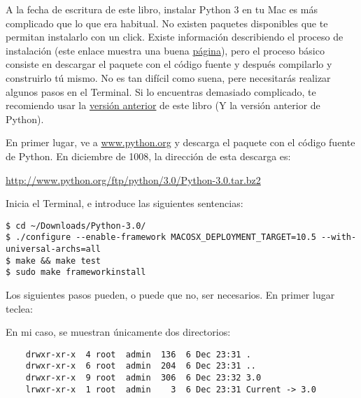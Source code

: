 \begin{MAC}

\noindent
A la fecha de escritura de este libro, instalar Python 3 en tu Mac es más complicado que lo que era habitual. No existen paquetes disponibles que te permitan instalarlo con un click. Existe información describiendo el proceso de instalación (este enlace muestra una buena \href{http://farmdev.com/thoughts/66/python-3-0-on-mac-os-x-alongside-2-6-2-5-etc-/}{página}), pero el proceso básico consiste en descargar el paquete con el código fuente y después compilarlo y construirlo tú mismo. No es tan difícil como suena, pere necesitarás realizar algunos pasos en el Terminal. Si lo encuentras demasiado complicado, te recomiendo usar la \href{http://www.briggs.net.nz/log/wp-content/uploads/2008/03/swfk-mac.zip}{versión anterior} de este libro (Y la versión anterior de Python).

\noindent
En primer lugar, ve a \href{www.python.org}{www.python.org} y descarga el paquete con el código fuente de Python. En diciembre de 1008, la dirección de esta descarga es:

\noindent
\href{http://www.python.org/ftp/python/3.0/Python-3.0.tar.bz2}{http://www.python.org/ftp/python/3.0/Python-3.0.tar.bz2}

\noindent
Inicia el Terminal, e introduce las siguientes sentencias:

\begin{listing}
\begin{verbatim}
$ cd ~/Downloads/Python-3.0/
$ ./configure --enable-framework MACOSX_DEPLOYMENT_TARGET=10.5 --with-universal-archs=all
$ make && make test
$ sudo make frameworkinstall
\end{verbatim}
\end{listing}

\noindent
Los siguientes pasos pueden, o puede que no, ser necesarios. En primer lugar teclea:


\noindent
En mi caso, se muestran únicamente dos directorios:

\begin{listing}
\begin{verbatim}
    drwxr-xr-x  4 root  admin  136  6 Dec 23:31 .
    drwxr-xr-x  6 root  admin  204  6 Dec 23:31 ..
    drwxr-xr-x  9 root  admin  306  6 Dec 23:32 3.0
    lrwxr-xr-x  1 root  admin    3  6 Dec 23:31 Current -> 3.0
\end{verbatim}
\end{listing}


\end{MAC}
